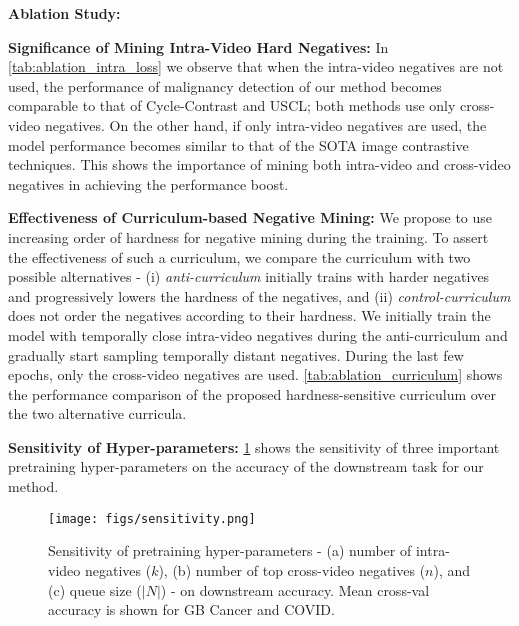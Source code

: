 \documentclass[runningheads]{llncs}
\newcommand{\myfirstpara}[1]{\par \noindent \textbf{#1:}}
\newcommand{\mypara}[1]{ \myfirstpara{#1}}
\begin{document}
\mypara{Ablation Study}
\begin{enumerate*}[label=(\arabic*)]
	\item \textbf{Significance of Mining Intra-Video Hard Negatives:}
%
In \cref{tab:ablation_intra_loss} we observe that when the intra-video negatives are not used, the performance of malignancy detection of our method becomes comparable to that of Cycle-Contrast and USCL; both methods use only cross-video negatives. On the other hand, if only intra-video negatives are used, the model performance becomes similar to that of the SOTA image contrastive techniques. This shows the importance of mining both intra-video and cross-video negatives in achieving the performance boost.

\item \textbf{Effectiveness of Curriculum-based Negative Mining:}
%
We propose to use increasing order of hardness for negative mining during the training. To assert the effectiveness of such a curriculum, we compare the curriculum with two possible alternatives - (i) \emph{anti-curriculum} initially trains with harder negatives and progressively lowers the hardness of the negatives, and (ii) \emph{control-curriculum}  does not order the negatives according to their hardness. We initially train the model with temporally close intra-video negatives during the anti-curriculum and gradually start sampling temporally distant negatives. During the last few epochs, only the cross-video negatives are used. \cref{tab:ablation_curriculum} shows the performance comparison of the proposed hardness-sensitive curriculum over the two alternative curricula.

\item \textbf{Sensitivity of Hyper-parameters:}
%
\cref{fig:sens-hyper} shows the sensitivity of three important pretraining hyper-parameters on the accuracy of the downstream task for our method.
\end{enumerate*}
%
\begin{figure}[t]
    \centering
    \texttt{[image: figs/sensitivity.png]}
    \caption{Sensitivity of pretraining hyper-parameters - (a) number of intra-video negatives ($k$), (b) number of top cross-video negatives ($n$), and (c) queue size ($|N|$) - on downstream accuracy. Mean cross-val accuracy is shown for GB Cancer and COVID.}
    \label{fig:sens-hyper}
\end{figure}

%
%
\end{document}
